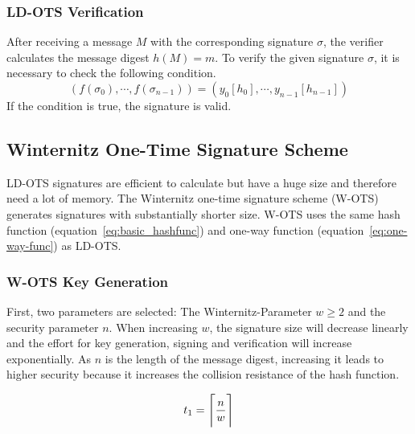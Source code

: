 \subsubsection{LD-OTS Verification}
After receiving a message $M$ with the corresponding signature $\sigma$, the verifier calculates the message digest $h(M) = m$. 
To verify the given signature $\sigma$, it is necessary to check the following condition.
\begin{equation}
\left(
f(\sigma_0), \cdots, f(\sigma_{n-1})
\right) =
\left(
y_0[h_0], \cdots, y_{n-1}[h_{n-1}]
\right)
\end{equation}
If the condition is true, the signature is valid.


\subsection{Winternitz One-Time Signature Scheme}
LD-OTS signatures are efficient to calculate but have a huge size and therefore need a lot of memory. The Winternitz one-time signature scheme (W-OTS) generates signatures with substantially shorter size. W-OTS uses the same hash function (equation~\ref{eq:basic_hashfunc}) and one-way function (equation~\ref{eq:one-way-func}) as LD-OTS. %

\subsubsection{W-OTS Key Generation}
\label{sec:WOTS_keygen}
First, two parameters are selected: The Winternitz-Parameter $w \geq 2$ and the security parameter $n$. When increasing $w$, the signature size will decrease linearly and the effort for key generation, signing and verification will increase exponentially. As $n$ is the length of the message digest, increasing it leads to higher security because it increases the collision resistance of the hash function. %

\begin{equation}
\label{eq:t1}
t_1 = \ceil[\Bigg]{\frac{n}{w}}
\end{equation}

